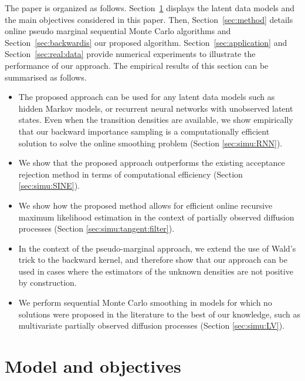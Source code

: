 \documentclass[12pt]{article}
\begin{document}
The paper is organized as follows. Section~\ref{sec:model} displays the latent data models and the main objectives considered in this paper. Then, Section~\ref{sec:method} details online pseudo marginal sequential Monte Carlo algorithms and Section~\ref{sec:backwardis} our proposed algorithm. Section~\ref{sec:application} and Section~\ref{sec:real:data}  provide  numerical experiments to illustrate the performance of our approach. The empirical results of this section can be summarised as follows.
\begin{itemize}
\item The proposed approach can be used for any latent data models such as hidden Markov models, or recurrent neural networks with unobserved latent states. Even when the transition densities are available, we show empirically that our backward importance sampling is a computationally efficient solution to solve the online smoothing problem (Section \ref{sec:simu:RNN}).
\item We show that the proposed approach outperforms the existing acceptance rejection method in terms of computational efficiency (Section \ref{sec:simu:SINE}). 
\item We show how the proposed method allows for efficient online recursive maximum likelihood estimation in the context of partially observed diffusion processes (Section \ref{sec:simu:tangent:filter}).
\item In the context of the pseudo-marginal approach, we extend the use of Wald's trick to the backward kernel, and therefore show that our approach can be used in cases where the estimators of the unknown densities  are not positive by construction.
\item  We perform sequential Monte Carlo smoothing in models for which no solutions were proposed in the literature to the best of our knowledge, such as multivariate partially observed diffusion processes (Section \ref{sec:simu:LV}).
\end{itemize}

\section{Model and objectives}
\label{sec:model}
\end{document}
